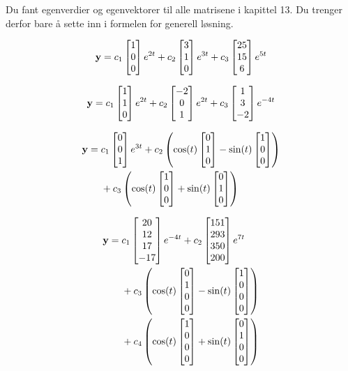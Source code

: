 \begin{losning}
Du fant egenverdier og egenvektorer til alle matrisene i kapittel 13. Du trenger derfor bare å sette inn i formelen for generell løsning.


\begin{punkt}
	$$\V{y}=c_1\vvv{1}{0}{0}e^{2t}+c_2\vvv{3}{1}{0}e^{3t}+c_3\vvv{25}{15}{6}e^{5t}$$
\end{punkt}

\begin{punkt}
	$$\V{y}=c_1\vvv{1}{1}{0}e^{2t}+c_2\vvv{-2}{0}{1}e^{2t}+c_3\vvv{1}{3}{-2}e^{-4t}$$
\end{punkt}

\begin{punkt}
$$	\begin{aligned}
	\V{y}= {} & c_1\vvv{0}{0}{1}e^{3t}+c_2\left(\cos (t) \vvv{0}{1}{0}-\sin (t) \vvv{1}{0}{0}\right)\\
	& +c_3\left(\cos (t) \vvv{1}{0}{0}+\sin (t) \vvv{0}{1}{0}\right)
	\end{aligned}$$
	
\end{punkt}

\begin{punkt} 
$$	\begin{aligned}
	\V{y}= {} & c_1\vvvv{20}{12}{17}{-17}e^{-4t} +c_2\vvvv{151}{293}{350}{200}e^{7t}\\
	& +c_3\left(\cos (t) \vvvv{0}{1}{0}{0}-\sin (t) \vvvv{1}{0}{0}{0}\right)\\
	& +c_4\left(\cos (t) \vvvv{1}{0}{0}{0}+\sin (t) \vvvv{0}{1}{0}{0}\right)
	\end{aligned}$$

\end{punkt}


	
\end{losning}


